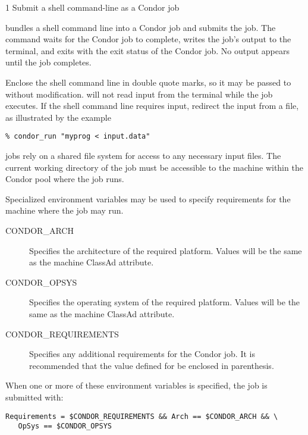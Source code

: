 \begin{ManPage}{\label{man-condor-run}}{1}
{Submit a shell command-line as a Condor job}
\Synopsis {}


\Description
{} bundles a shell command line into a Condor
job and submits the job.
The  command waits for the Condor job to complete,
writes the job's output to the terminal,
and exits with the exit status of the Condor job.
No output appears until the job completes.

Enclose the shell command line in double quote marks,
so it may be passed to
 without modification.
 will not read input from the terminal while the job
executes.  If the shell command line requires input,
redirect the input from a file, as illustrated by the example
\begin{verbatim}
% condor_run "myprog < input.data"
\end{verbatim}

 jobs rely on a shared file system for
access to any necessary input files.
The current working directory of the job must be
accessible to the machine within the Condor pool where the job runs.

Specialized environment variables may be used to specify
requirements for the machine where the job may run.

\begin{description}
\item[CONDOR\_ARCH] Specifies the architecture of the required
  platform. Values will be the same as the 
  machine ClassAd attribute.
\item[CONDOR\_OPSYS] Specifies the operating system of the required
  platform. Values will be the same as the 
  machine ClassAd attribute.
\item[CONDOR\_REQUIREMENTS] Specifies any additional requirements for
  the Condor job.  It is recommended that the value defined for
   be enclosed in parenthesis.
\end{description}

When one or more of these environment variables is specified, the job is
submitted with:

\begin{verbatim}
Requirements = $CONDOR_REQUIREMENTS && Arch == $CONDOR_ARCH && \
   OpSys == $CONDOR_OPSYS
\end{verbatim}


\end{ManPage}

